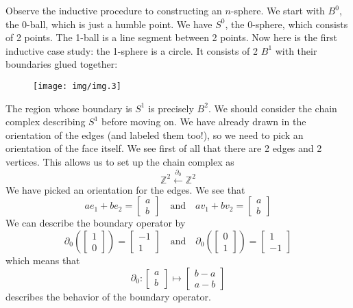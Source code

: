 
Observe the inductive procedure to constructing an $n$-sphere. We
start with $B^{0}$, the 0-ball, which is just a humble point. We
have $S^{0}$, the 0-sphere, which consists of 2 points. The
1-ball is a line segment between 2 points. Now here is the first
inductive case study: the 1-sphere is a circle. It consists of 2
$B^{1}$ with their boundaries glued together: 
\begin{figure}[h]
\begin{center}
\texttt{[image: img/img.3]}
\end{center}
\end{figure}
The region whose boundary is $S^{1}$ is precisely $B^{2}$. We
should consider the chain complex describing $S^{1}$ before
moving on. We have already drawn in the orientation of the edges
(and labeled them too!), so we need to pick an orientation of the
face itself. We see first of all that there are 2 edges and 2
vertices. This allows us to set up the chain complex as
\begin{equation}%
\mathbb{Z}^{2}\xleftarrow{\partial_{0}}\mathbb{Z}^{2}
\end{equation}
We have picked an orientation for the edges. We see that
\begin{equation}%
ae_{1}+be_{2}=\begin{bmatrix}a\\b\end{bmatrix}\quad\text{and}\quad 
av_{1}+bv_{2}=\begin{bmatrix}a\\b\end{bmatrix}
\end{equation}
We can describe the boundary operator by
\begin{equation}%
\partial_{0}\left(\begin{bmatrix}1\\0\end{bmatrix}\right)=\begin{bmatrix}-1\\1\end{bmatrix}\quad\text{and}\quad
\partial_{0}\left(\begin{bmatrix}0\\1\end{bmatrix}\right)=\begin{bmatrix}1\\-1\end{bmatrix}
\end{equation}
which means that
\begin{equation}%
\partial_{0}:\begin{bmatrix}a\\b\end{bmatrix}\mapsto\begin{bmatrix}b-a\\a-b\end{bmatrix}
\end{equation}
describes the behavior of the boundary operator.

